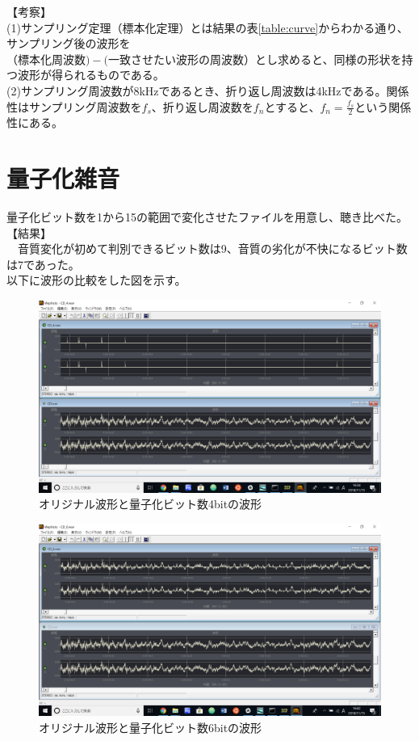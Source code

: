 \documentclass[uplatex, titlepage]{jsarticle}
\begin{document}
【考察】\\
(1)サンプリング定理（標本化定理）\cite{one}とは結果の表\ref{table:curve}からわかる通り、サンプリング後の波形を\\$（標本化周波数) - (一致させたい波形の周波数）$とし求めると、同様の形状を持つ波形が得られるものである。\\
(2)サンプリング周波数が8kHzであるとき、折り返し周波数は4kHzである。関係性はサンプリング周波数を$f_s$、折り返し周波数を$f_n$とすると、$f_n = \frac{f_s}{2}$という関係性にある。

\section{量子化雑音}

  量子化ビット数を1から15の範囲で変化させたファイルを用意し、聴き比べた。\\
【結果】\\
　音質変化が初めて判別できるビット数は9、音質の劣化が不快になるビット数は7であった。\\
以下に波形の比較をした図を示す。

\begin{figure}[H]
  \centering
  \includegraphics[scale=0.4]{./tuusin1.4/diff4.png}
  \caption{オリジナル波形と量子化ビット数4bitの波形}
  \label{fig:4bit}
\end{figure}

\begin{figure}[H]
  \centering
  \includegraphics[scale=0.4]{./tuusin1.4/diff6.png}
  \caption{オリジナル波形と量子化ビット数6bitの波形}
  \label{fig:6bit}
\end{figure}
\end{document}

